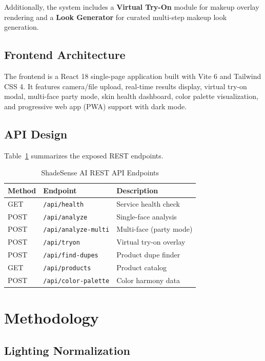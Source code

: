 \documentclass[conference]{IEEEtran}
\begin{document}
Additionally, the system includes a \textbf{Virtual Try-On} module for makeup overlay rendering and a \textbf{Look Generator} for curated multi-step makeup look generation.

\subsection{Frontend Architecture}

The frontend is a React 18 single-page application built with Vite 6 and Tailwind CSS 4. It features camera/file upload, real-time results display, virtual try-on modal, multi-face party mode, skin health dashboard, color palette visualization, and progressive web app (PWA) support with dark mode.

\subsection{API Design}

Table~\ref{tab:api_endpoints} summarizes the exposed REST endpoints.

\begin{table}[t]
\centering
\caption{ShadeSense AI REST API Endpoints}
\label{tab:api_endpoints}
\begin{tabular}{lll}
\toprule
\textbf{Method} & \textbf{Endpoint} & \textbf{Description} \\
\midrule
GET & \texttt{/api/health} & Service health check \\
POST & \texttt{/api/analyze} & Single-face analysis \\
POST & \texttt{/api/analyze-multi} & Multi-face (party mode) \\
POST & \texttt{/api/tryon} & Virtual try-on overlay \\
POST & \texttt{/api/find-dupes} & Product dupe finder \\
GET & \texttt{/api/products} & Product catalog \\
POST & \texttt{/api/color-palette} & Color harmony data \\
\bottomrule
\end{tabular}
\end{table}

\section{Methodology}

\subsection{Lighting Normalization}
\end{document}
